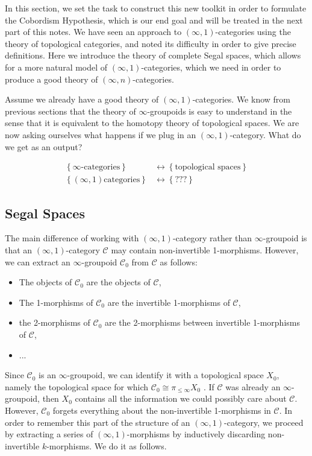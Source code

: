 \documentclass[a4paper,11pt]{article}
\newcommand{\ccal}{\mathcal{C}}
\theoremstyle{plain}
\theoremstyle{definition}
\theoremstyle{remark}
\begin{document}
In this section, we set the task to construct this new toolkit in order to formulate the Cobordism Hypothesis, which is our end goal and will be treated in the next part of this notes. We have seen an approach to $(\infty, 1)$-categories using the theory of topological categories, and noted its difficulty in order to give precise definitions. Here we introduce the theory of complete Segal spaces, which allows for a more natural model of $(\infty, 1)$-categories, which we need in order to produce a good theory of $(\infty, n)$-categories. 


Assume we already have a good theory of $(\infty, 1)$-categories. We know from previous sections that the theory of $\infty$-groupoids is easy to understand in the sense that it is equivalent to the homotopy theory of topological spaces. We are now asking ourselves what happens if we plug in an $(\infty, 1)$-category. What do we get as an output? 

\begin{align*}
\left\{ \infty \text{-categories}\right\} & \longleftrightarrow \left\{ \text{topological spaces}\right\}\\
\left\{ (\infty, 1)\text{categories}\right\} & \longleftrightarrow \left\{ ???\right\} 
\end{align*}

\subsection{Segal Spaces}

The main difference of working with $(\infty, 1)$-category rather than $\infty$-groupoid is that an $(\infty, 1)$-category $\ccal$ may contain non-invertible 1-morphisms. However, we can extract an $\infty$-groupoid $\ccal_0$ from $\ccal$ as follows:
\begin{itemize}
    \item The objects of $\ccal_0$ are the objects of $\ccal$, 
    \item The 1-morphisms of $\ccal_0$ are the invertible 1-morphisms of $\ccal$, 
    \item the 2-morphisms of $\ccal_0$ are the 2-morphisms between invertible 1-morphisms of $\ccal$, 
    \item ...
\end{itemize}
Since $\ccal_0$ is an $\infty$-groupoid, we can identify it with a topological space $X_0$, namely the topological space for which $\ccal_0 \cong \pi_{\leq \infty} X_0$ . If $\ccal$ was already an $\infty$-groupoid, then $X_0$ contains all the information we could possibly care about $\ccal$. However, $\ccal_0$ forgets everything about the non-invertible 1-morphisms in $\ccal$. In order to remember this part of the structure of an $(\infty, 1)$-category, we proceed by extracting a series of $(\infty, 1)$-morphisms by inductively discarding non-invertible $k$-morphisms. We do it as follows. 
\end{document}
